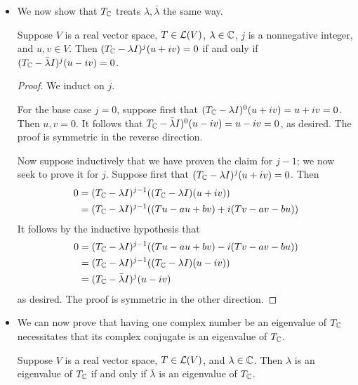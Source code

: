 \documentclass[../main.tex]{subfiles}
\begin{document}
\begin{itemize}
\begin{theorem}
\begin{proof}[Proof\footnote{\textcite{bib:Axler} also offers a more straightforward proof using the typical definition of eigenvalues and eigenvectors.}]
\begin{align*}
                &\Longleftrightarrow \lambda\text{ is an eigenvalue of }T\tag*{Theorem \ref{trm:minPolyZeroes}}
            \end{align*}
            as desired.
        \end{proof}
    \end{theorem}
    \item We now show that $T_{\mathbb{C}}$ treats $\lambda,\bar{\lambda}$ the same way.
    \begin{theorem}\label{trm:genEigenvalueConjugate}
        Suppose $V$ is a real vector space, $T\in\mathcal{L}(V)$, $\lambda\in\mathbb{C}$, $j$ is a nonnegative integer, and $u,v\in V$. Then $(T_{\mathbb{C}}-\lambda I)^j(u+iv)=0$ if and only if $(T_{\mathbb{C}}-\bar{\lambda}I)^j(u-iv)=0$.
        \begin{proof}
            We induct on $j$.\par
            For the base case $j=0$, suppose first that $(T_{\mathbb{C}}-\lambda I)^0(u+iv)=u+iv=0$. Then $u,v=0$. It follows that $T_{\mathbb{C}}-\bar{\lambda}I)^0(u-iv)=u-iv=0$, as desired. The proof is symmetric in the reverse direction.\par
            Now suppose inductively that we have proven the claim for $j-1$; we now seek to prove it for $j$. Suppose first that $(T_{\mathbb{C}}-\lambda I)^j(u+iv)=0$. Then
            \begin{align*}
                0 &= (T_{\mathbb{C}}-\lambda I)^{j-1}((T_{\mathbb{C}}-\lambda I)(u+iv))\\
                &= (T_{\mathbb{C}}-\lambda I)^{j-1}((Tu-au+bv)+i(Tv-av-bu))
            \end{align*}
            It follows by the inductive hypothesis that
            \begin{align*}
                0 &= (T_{\mathbb{C}}-\lambda I)^{j-1}((Tu-au+bv)-i(Tv-av-bu))\\
                &= (T_{\mathbb{C}}-\lambda I)^{j-1}((T_{\mathbb{C}}-\lambda I)(u-iv))\\
                &= (T_{\mathbb{C}}-\bar{\lambda}I)^j(u-iv)
            \end{align*}
            as desired. The proof is symmetric in the other direction.
        \end{proof}
    \end{theorem}
    \item We can now prove that having one complex number be an eigenvalue of $T_{\mathbb{C}}$ necessitates that its complex conjugate is an eigenvalue of $T_{\mathbb{C}}$.
    \begin{theorem}\label{trm:eigenConjugate}
        Suppose $V$ is a real vector space, $T\in\mathcal{L}(V)$, and $\lambda\in\mathbb{C}$. Then $\lambda$ is an eigenvalue of $T_{\mathbb{C}}$ if and only if $\bar{\lambda}$ is an eigenvalue of $T_{\mathbb{C}}$.

\end{theorem}
\end{itemize}
\end{document}
